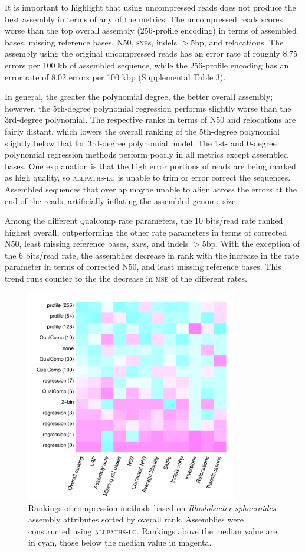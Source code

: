 \documentclass{bioinfo}
\begin{document}
It is important to highlight that using uncompressed reads does not
produce the best assembly in terms of any of the metrics. The
uncompressed reads scores worse than the top overall assembly
(256-profile encoding) in terms of assembled bases, missing reference
bases, N50, \textsc{snp}s, indels $>$5bp, and relocations. The
assembly using the original uncompressed reads has an error rate of
roughly 8.75 errors per 100 kb of assembled sequence, while the
256-profile encoding has an error rate of 8.02 errors per 100 kbp
(Supplemental Table 3).

In general, the greater the polynomial degree, the better overall
assembly; however, the 5th-degree polynomial regression performs
slightly worse than the 3rd-degree polynomial. The respective ranks in
terms of N50 and relocations are fairly distant, which lowers the
overall ranking of the 5th-degree polynomial slightly below that for
3rd-degree polynomial model. The 1st- and 0-degree polynomial
regression methods perform poorly in all metrics except assembled
bases. One explanation is that the high error portions of reads are
being marked as high quality, so \textsc{allpaths-lg} is unable to
trim or error correct the sequences. Assembled sequences that overlap
maybe unable to align across the errors at the end of the reads,
artificially inflating the assembled genome size.

Among the different \textsc{q}ual\textsc{c}omp rate parameters, the 10
bits/read rate ranked highest overall, outperforming the other rate
parameters in terms of corrected N50, least missing reference bases,
\textsc{snp}s, and indels $>$5bp. With the exception of the 6
bits/read rate, the assemblies decrease in rank with the increase in
the rate parameter in terms of corrected N50, and least missing
reference bases. This trend runs counter to the the decrease in
\textsc{mse} of the different rates.

\begin{figure}[!tbp]
\centerline{\includegraphics[width=3.65in]{rhodo_assembly_results.pdf}}
\caption{Rankings of compression methods based on \textit{Rhodobacter
    sphaeroides} assembly attributes sorted by overall
  rank. Assemblies were constructed using \textsc{allpaths-lg}.
  Rankings above the median value are in cyan, those below the median
  value in magenta.}
  \label{fig:assembly_ranks}
\end{figure}
\end{document}
